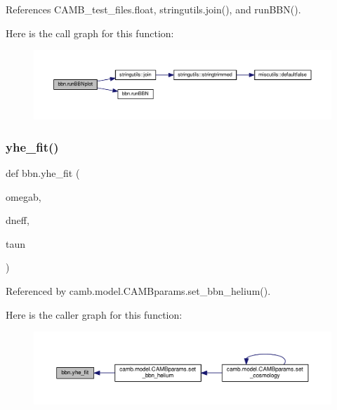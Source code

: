 References C\+A\+M\+B\+\_\+test\+\_\+files.\+float, stringutils.\+join(), and run\+B\+B\+N().

Here is the call graph for this function\+:
\nopagebreak
\begin{figure}[H]
\begin{center}
\leavevmode
\includegraphics[width=350pt]{namespacebbn_a3b8ec567ef2fdae1e1daf85d6d520717_cgraph}
\end{center}
\end{figure}
\mbox{\label{namespacebbn_a661709a863752020661d412858487224}} 
\subsubsection{\texorpdfstring{yhe\+\_\+fit()}{yhe\_fit()}}
{\footnotesize\ttfamily def bbn.\+yhe\+\_\+fit (\begin{DoxyParamCaption}\item[{}]{omegab,  }\item[{}]{dneff,  }\item[{}]{taun }\end{DoxyParamCaption})}



Referenced by camb.\+model.\+C\+A\+M\+Bparams.\+set\+\_\+bbn\+\_\+helium().

Here is the caller graph for this function\+:
\nopagebreak
\begin{figure}[H]
\begin{center}
\leavevmode
\includegraphics[width=350pt]{namespacebbn_a661709a863752020661d412858487224_icgraph}
\end{center}
\end{figure}
\mbox{\label{namespacebbn_a2847147342b47e9a0dcfffe3f33ba3c8}} 
